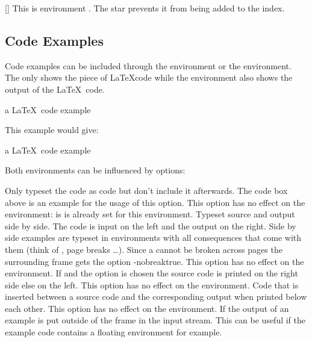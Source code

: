 \documentclass[load-preamble+]{cnltx-doc}
\begin{document}
\begin{example}
  \begin{environments}
    []
      This is environment .  The star prevents it from being
      added to the index.
  \end{environments}
\end{example}

\subsection{Code Examples}\label{sec:usage:examples}
Code examples can be included through the  environment or the
 environment.  The  only shows the piece of
\LaTeX code while the  environment also shows the output of the
\LaTeX\ code.
\begin{sourcecode}
  \begin{example}
    a \LaTeX\ code example
  \end{example}
\end{sourcecode}
This example would give:

\begin{example}
  a \LaTeX\ code example
\end{example}

Both environments can be influenced by options:
\begin{options}
    Only typeset the code as code but don't include it afterwards.  The
    code box above is an example for the usage of this option.  This option
    has no effect on the  environment: is is already set for
    this environment.
    Typeset source and output side by side.  The code is input on the left and
    the output on the right.  Side by side examples are typeset in
     environments with all consequences that come with them
    (think of , page breaks \ldots).  Since a 
    cannot be broken across pages the surrounding  frame gets
    the option \keyis*-{nobreak}{true}.  This option has no effect on the
     environment.
    If  and the option  is chosen the source
    code is printed on the right side else on the left.  This option has no
    effect on the  environment.
    Code that is inserted between a source code and the corresponding output
    when printed below each other.  This option has no effect on the
     environment.
    If  the output of an example is put outside
    of the frame in the input stream.  This can be useful if the example code
    contains a floating environment for example.
\end{options}
\end{document}
